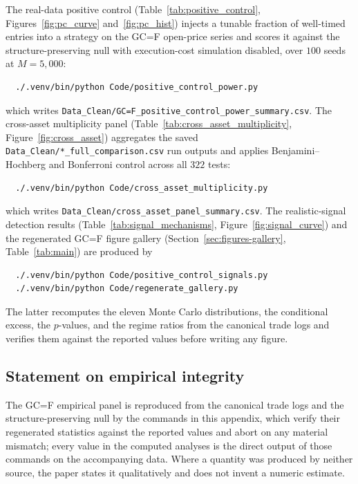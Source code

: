\documentclass[preprint,12pt]{elsarticle}
\theoremstyle{definition}
\begin{document}
The real-data positive control (Table~\ref{tab:positive_control}, Figures~\ref{fig:pc_curve} and~\ref{fig:pc_hist}) injects a tunable fraction of well-timed entries into a strategy on the GC=F open-price series and scores it against the structure-preserving null with execution-cost simulation disabled, over $100$ seeds at $M=5{,}000$:
\begin{verbatim}
  ./.venv/bin/python Code/positive_control_power.py
\end{verbatim}
which writes \texttt{Data\_Clean/\allowbreak GC=F\_positive\_control\_power\_summary.csv}. The cross-asset multiplicity panel (Table~\ref{tab:cross_asset_multiplicity}, Figure~\ref{fig:cross_asset}) aggregates the saved \texttt{Data\_Clean/*\_full\_comparison.csv} run outputs and applies Benjamini--Hochberg and Bonferroni control across all $322$ tests:
\begin{verbatim}
  ./.venv/bin/python Code/cross_asset_multiplicity.py
\end{verbatim}
which writes \texttt{Data\_Clean/cross\_asset\_panel\_summary.csv}. The realistic-signal detection results (Table~\ref{tab:signal_mechanisms}, Figure~\ref{fig:signal_curve}) and the regenerated GC=F figure gallery (Section~\ref{sec:figures-gallery}, Table~\ref{tab:main}) are produced by
\begin{verbatim}
  ./.venv/bin/python Code/positive_control_signals.py
  ./.venv/bin/python Code/regenerate_gallery.py
\end{verbatim}
The latter recomputes the eleven Monte Carlo distributions, the conditional excess, the $p$-values, and the regime ratios from the canonical trade logs and verifies them against the reported values before writing any figure.

\subsection{Statement on empirical integrity}

The GC=F empirical panel is reproduced from the canonical trade logs and the structure-preserving null by the commands in this appendix, which verify their regenerated statistics against the reported values and abort on any material mismatch; every value in the computed analyses is the direct output of those commands on the accompanying data. Where a quantity was produced by neither source, the paper states it qualitatively and does not invent a numeric estimate.


\end{document}
